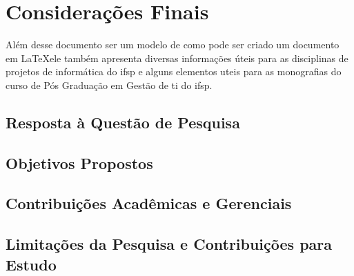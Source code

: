 \chapter{Considerações Finais}



Além desse documento ser um modelo de como pode ser criado um documento em \LaTeX \space ele também apresenta diversas informações úteis para as disciplinas de projetos de informática do \ac{ifsp} e alguns elementos uteis para as monografias do curso de Pós Graduação em Gestão de \acs{ti} do \ac{ifsp}.


\preencheComTexto


\section{Resposta à Questão de Pesquisa}
\preencheComTexto

\section{Objetivos Propostos}
\preencheComTexto

\section{Contribuições Acadêmicas e Gerenciais}
\preencheComTexto

\section{Limitações da Pesquisa e Contribuições para Estudo}
\preencheComTexto
